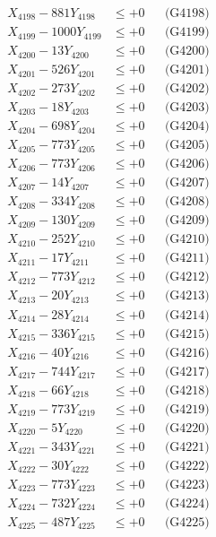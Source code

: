 \documentclass[a4paper,10pt]{article}
\begin{document}
{\begin{align}
X_{4198} - 881Y_{4198} &\leq +0 && \text{(G4198)} \\
X_{4199} - 1000Y_{4199} &\leq +0 && \text{(G4199)} \\
X_{4200} - 13Y_{4200} &\leq +0 && \text{(G4200)} \\
\allowbreak
X_{4201} - 526Y_{4201} &\leq +0 && \text{(G4201)} \\
X_{4202} - 273Y_{4202} &\leq +0 && \text{(G4202)} \\
X_{4203} - 18Y_{4203} &\leq +0 && \text{(G4203)} \\
X_{4204} - 698Y_{4204} &\leq +0 && \text{(G4204)} \\
X_{4205} - 773Y_{4205} &\leq +0 && \text{(G4205)} \\
X_{4206} - 773Y_{4206} &\leq +0 && \text{(G4206)} \\
X_{4207} - 14Y_{4207} &\leq +0 && \text{(G4207)} \\
X_{4208} - 334Y_{4208} &\leq +0 && \text{(G4208)} \\
X_{4209} - 130Y_{4209} &\leq +0 && \text{(G4209)} \\
X_{4210} - 252Y_{4210} &\leq +0 && \text{(G4210)} \\
\allowbreak
X_{4211} - 17Y_{4211} &\leq +0 && \text{(G4211)} \\
X_{4212} - 773Y_{4212} &\leq +0 && \text{(G4212)} \\
X_{4213} - 20Y_{4213} &\leq +0 && \text{(G4213)} \\
X_{4214} - 28Y_{4214} &\leq +0 && \text{(G4214)} \\
X_{4215} - 336Y_{4215} &\leq +0 && \text{(G4215)} \\
X_{4216} - 40Y_{4216} &\leq +0 && \text{(G4216)} \\
X_{4217} - 744Y_{4217} &\leq +0 && \text{(G4217)} \\
X_{4218} - 66Y_{4218} &\leq +0 && \text{(G4218)} \\
X_{4219} - 773Y_{4219} &\leq +0 && \text{(G4219)} \\
X_{4220} - 5Y_{4220} &\leq +0 && \text{(G4220)} \\
\allowbreak
X_{4221} - 343Y_{4221} &\leq +0 && \text{(G4221)} \\
X_{4222} - 30Y_{4222} &\leq +0 && \text{(G4222)} \\
X_{4223} - 773Y_{4223} &\leq +0 && \text{(G4223)} \\
X_{4224} - 732Y_{4224} &\leq +0 && \text{(G4224)} \\
X_{4225} - 487Y_{4225} &\leq +0 && \text{(G4225)} \\

\end{align}}
\end{document}
